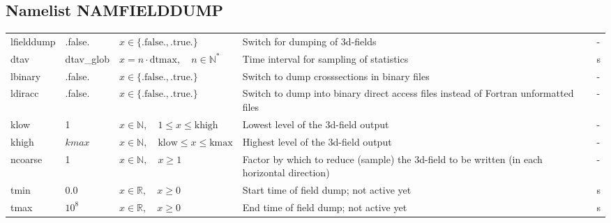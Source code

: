 \documentclass[twoside,11pt,fleqn,a4paper,english,openright]{report}
\begin{document}
\subsection{Namelist NAMFIELDDUMP}\label{par:fielddump}

\begin{center}
  \tablelasttail{
        &&&&\\\hline
  }
\begin{supertabular}{|l|p{1.6cm}|p{4.8cm}|p{6cm}|l|}
  lfielddump	& .false.	& $x\in\{\text{.false.},\text{.true.}\}$	& Switch for dumping of 3d-fields		& -\\
  dtav		& dtav\_glob	& $x = n \cdot \text{dtmax}, \quad n \in \mathbb{N}^*$	& Time interval for sampling of statistics	& s\\
  lbinary	& .false.	& $x\in\{\text{.false.},\text{.true.}\}$	& Switch to dump crosssections in binary files	& -\\  
  ldiracc	& .false.	& $x\in\{\text{.false.},\text{.true.}\}$	& Switch to dump into binary direct access files instead of Fortran unformatted files		& -\\
  klow		& 1		& $x \in \mathbb{N}, \quad 1 \le x \le \text{khigh}$	& Lowest level of the 3d-field output		& -\\
  khigh		& $kmax$	& $x \in \mathbb{N}, \quad \text{klow} \le x \le \text{kmax}$	& Highest level of the 3d-field output		& -\\
  ncoarse		& 1	& $x \in \mathbb{N}, \quad x \geq 1 $	& Factor by which to reduce (sample) the 3d-field to be written (in each horizontal direction)	& -\\
  tmin		& 0.0		& $x \in \mathbb{R}, \quad x \geq 0$	& Start time of field dump; not active yet	& s \\
  tmax		& $10^8$	& $x \in \mathbb{R}, \quad x \geq 0$	& End time of field dump; not active yet	& s \\
\end{supertabular}
\end{center}
\end{document}
